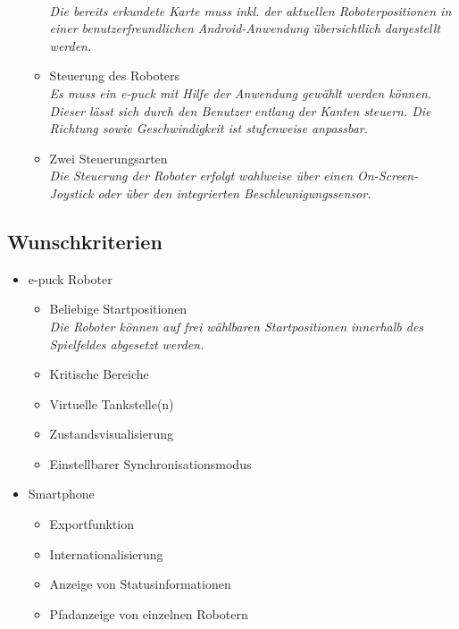 \documentclass[10pt,a4paper]{article}
\begin{document}
\begin{itemize}
\begin{itemize}
						\\ \textsl{Die bereits erkundete Karte muss inkl. der aktuellen Roboterpositionen in einer
							benutzerfreundlichen Android-Anwendung übersichtlich dargestellt werden.}		
					\item Steuerung des Roboters
						\\ \textsl{Es muss ein e-puck mit Hilfe der Anwendung gewählt werden können. Dieser lässt sich
							durch den Benutzer entlang der Kanten steuern. Die Richtung sowie Geschwindigkeit ist
							stufenweise anpassbar.}		
					\item Zwei Steuerungsarten
						\\ \textsl{Die Steuerung der Roboter erfolgt wahlweise über einen On-Screen- Joystick oder über
							den integrierten Beschleunigungssensor.}											
				\end{itemize}
			\end{itemize}
		\subsection{Wunschkriterien}
			\begin{itemize}
				\item e-puck Roboter
				\begin{itemize}
					\item Beliebige Startpositionen
						\\ \textsl{Die Roboter können auf frei wählbaren Startpositionen innerhalb des Spielfeldes
							abgesetzt werden.}
					\item Kritische Bereiche
					\item Virtuelle Tankstelle(n)
					\item Zustandsvisualisierung	
					\item Einstellbarer Synchronisationsmodus
				\end{itemize}
				\item Smartphone
				\begin{itemize}
					\item Exportfunktion
					\item Internationalisierung	
					\item Anzeige von Statusinformationen
					\item Pfadanzeige von einzelnen Robotern										
				\end{itemize}
			\end{itemize}
\end{document}
